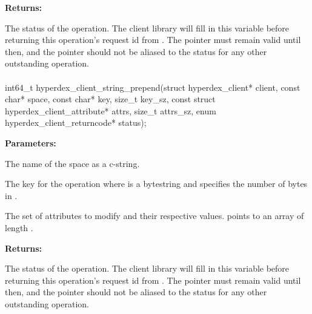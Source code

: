 \noindent\textbf{Returns:}
\begin{description}[labelindent=\widthof{{\code{status}}},leftmargin=*,noitemsep,nolistsep,align=right]
\item[\code{status}] The status of the operation.  The client library will fill in this variable before returning this operation's request id from .  The pointer must remain valid until then, and the pointer should not be aliased to the status for any other outstanding operation.
\end{description}

\paragraph{}
\begin{ccode}
int64_t hyperdex_client_string_prepend(struct hyperdex_client* client,
                const char* space,
                const char* key, size_t key_sz,
                const struct hyperdex_client_attribute* attrs, size_t attrs_sz,
                enum hyperdex_client_returncode* status);
\end{ccode}
\funcdesc 

\noindent\textbf{Parameters:}
\begin{description}[labelindent=\widthof{{\code{attrs}, \code{attrs\_sz}}},leftmargin=*,noitemsep,nolistsep,align=right]
\item[\code{space}] The name of the space as a c-string.
\item[\code{key}, \code{key\_sz}] The key for the operation where  is a bytestring and  specifies the number of bytes in .
\item[\code{attrs}, \code{attrs\_sz}] The set of attributes to modify and their respective values.   points to an array of length .
\end{description}

\noindent\textbf{Returns:}
\begin{description}[labelindent=\widthof{{\code{status}}},leftmargin=*,noitemsep,nolistsep,align=right]
\item[\code{status}] The status of the operation.  The client library will fill in this variable before returning this operation's request id from .  The pointer must remain valid until then, and the pointer should not be aliased to the status for any other outstanding operation.
\end{description}

